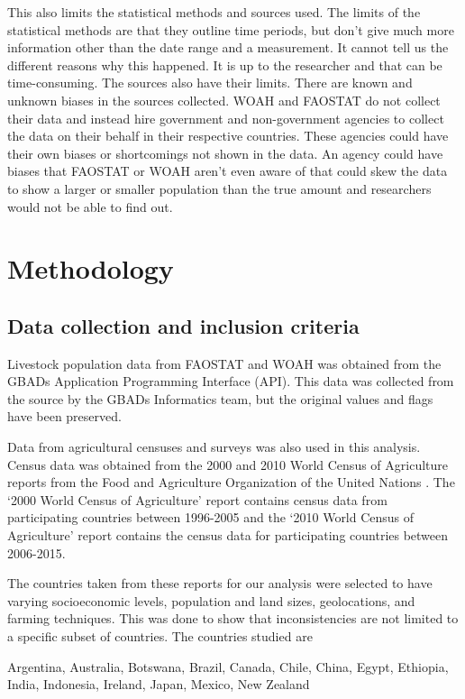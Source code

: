 \documentclass{article}
\begin{document}
This also limits the statistical methods and sources used. The limits of the statistical methods are that they outline time periods, but don't give much more information other than the date range and a measurement. It cannot tell us the different reasons why this happened. It is up to the researcher and that can be time-consuming. The sources also have their limits. There are known and unknown biases in the sources collected. WOAH and FAOSTAT do not collect their data and instead hire government and non-government agencies to collect the data on their behalf in their respective countries. These agencies could have their own biases or shortcomings not shown in the data. An agency could have biases that FAOSTAT or WOAH aren't even aware of that could skew the data to show a larger or smaller population than the true amount and researchers would not be able to find out.

\section{Methodology}
\subsection{Data collection and inclusion criteria }
Livestock population data from FAOSTAT and WOAH was obtained from the GBADs Application Programming Interface (API). This data was collected from the source by the GBADs Informatics team, but the original values and flags have been preserved. 

Data from agricultural censuses and surveys was also used in this analysis. Census data was obtained from the 2000 and 2010 World Census of Agriculture reports from the Food and Agriculture Organization of the United Nations \citep{WorldCensusOne, WorldCensusTwo}. The `2000 World Census of Agriculture' report contains census data from participating countries between 1996-2005 and the `2010 World Census of Agriculture' report contains the census data for participating countries between 2006-2015. 

The countries taken from these reports for our analysis were selected to have varying socioeconomic levels, population and land sizes, geolocations, and farming techniques. This was done to show that inconsistencies are not limited to a specific subset of countries. The countries studied are

Argentina, Australia, Botswana, Brazil, Canada, Chile, China, Egypt, Ethiopia, India, Indonesia, Ireland, Japan, Mexico, New Zealand
\end{document}
